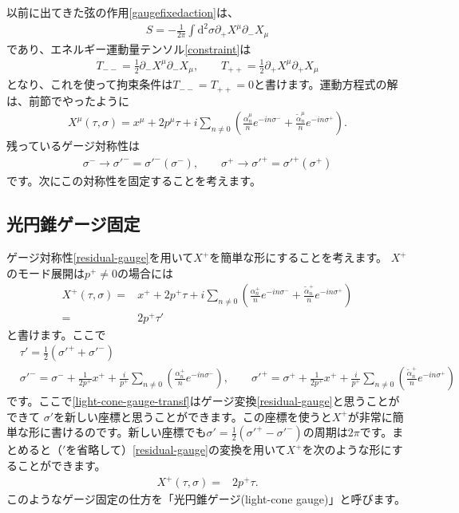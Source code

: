 \documentclass[report,paper=a4, fontsize=12pt, line_length=16cm, number_of_lines=34,dvipdfmx]{jlreq}
\numberwithin{equation}{chapter}
\numberwithin{equation}{section}
\newcommand{\del}{\partial}
\newcommand{\alphat}{\tilde{\alpha}}
\newcommand{\di}{\mathrm{d}}
\begin{document}
以前に出てきた弦の作用\eqref{gaugefixedaction}は、
\begin{align}
S=-\frac{1}{2\pi}\int \di^2\sigma \del_{+}X^{\mu}\del_{-}X_{\mu}
\end{align}
であり、エネルギー運動量テンソル\eqref{constraint}は
\begin{align}
T_{--}=\frac12 \del_{-}X^{\mu}\del_{-}X_{\mu},
\qquad
T_{++}=\frac12 \del_{+}X^{\mu}\del_{+}X_{\mu}\label{EMtensor}
\end{align}
となり、これを使って拘束条件は$T_{--}=T_{++}=0$と書けます。運動方程式の解は、前節でやったように
\begin{align}
X^{\mu}(\tau,\sigma)=x^{\mu}+2p^{\mu}\tau+i\sum_{n\ne 0} \left(
\frac{\alpha^{\mu}_{n}}{n}e^{-in\sigma^{-}}
+\frac{\alphat^{\mu}_{n}}{n}e^{-in\sigma^{+}}
\right).
\end{align}
残っているゲージ対称性は
\begin{align}
\sigma^{-}\to \sigma'^{-}=\sigma'^{-}(\sigma^{-}),\qquad 
\sigma^{+}\to \sigma'^{+}=\sigma'^{+}(\sigma^{+})
\label{residual-gauge}
\end{align}
です。次にこの対称性を固定することを考えます。
\subsection{光円錐ゲージ固定}
ゲージ対称性\eqref{residual-gauge}を用いて$X^{+}$を簡単な形にすることを考えます。
$X^{+}$のモード展開は$p^{+}\ne 0$の場合には
\begin{align}
X^{+}(\tau,\sigma)=&x^{+}+2p^{+}\tau+i\sum_{n\ne 0} \left(
\frac{\alpha^{+}_{n}}{n}e^{-in\sigma^{-}}
+\frac{\alphat^{+}_{n}}{n}e^{-in\sigma^{+}}
\right)\\
=&2p^{+}\tau'
\end{align}
と書けます。ここで
\begin{align}
&\tau'=\frac12(\sigma'^{+}+\sigma'^{-})\\
&
\sigma'^{-}=\sigma^{-}+\frac{1}{2p^{+}}x^{+}+\frac{i}{p^{+}}\sum_{n\ne 0} \left(
\frac{\alpha^{+}_{n}}{n}e^{-in\sigma^{-}}
\right)
,\qquad
\sigma'^{+}=\sigma^{+}+\frac{1}{2p^{+}}x^{+}+\frac{i}{p^{+}}\sum_{n\ne 0} \left(
\frac{\alphat^{+}_{n}}{n}e^{-in\sigma^{+}}
\right)
\label{light-cone-gauge-transf}
\end{align}
です。ここで\eqref{light-cone-gauge-transf}はゲージ変換\eqref{residual-gauge}と思うことができて
$\sigma'$を新しい座標と思うことができます。この座標を使うと$X^{+}$が非常に簡単な形に書けるのです。新しい座標でも$\sigma'=\frac12(\sigma'^{+}-\sigma'^{-})$の周期は$2\pi$です。まとめると（${}'$を省略して）\eqref{residual-gauge}の変換を用いて$X^{+}$を次のような形にすることができます。
\begin{align}
X^{+}(\tau,\sigma)=&2p^{+}\tau.
\label{light-cone-gauge-fixing}
\end{align}
このようなゲージ固定の仕方を「光円錐ゲージ(light-cone gauge)」と呼びます。
\end{document}
